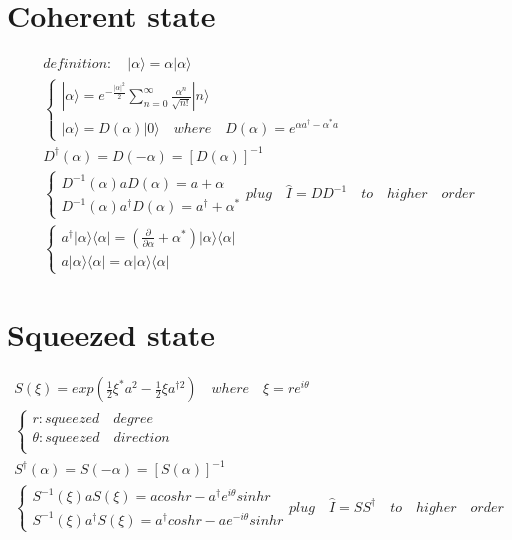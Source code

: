 \documentclass{article}  %
\begin{document}
\section{Coherent state}

\begin{gather}
definition: \quad |\alpha\rangle=\alpha|\alpha\rangle\\
\begin{cases}
|\alpha\rangle=e^{-\frac{|\alpha|^2}{2}}\sum_{n=0}^\infty\frac{\alpha^n}{\sqrt{n!}}|n\rangle\\
|\alpha\rangle=D(\alpha)|0\rangle \quad where \quad D(\alpha)=e^{\alpha a^\dagger-\alpha^*a}
\end{cases}\\
D^\dagger(\alpha)=D(-\alpha)=[D(\alpha)]^{-1}\\
\begin{cases}
D^{-1}(\alpha)aD(\alpha)=a+\alpha\\
D^{-1}(\alpha)a^\dagger D(\alpha)=a^\dagger+\alpha^*
\end{cases}  plug \quad \hat{I}=DD^{-1}\quad to\quad higher \quad order\\
\begin{cases}
a^\dagger|\alpha\rangle\langle\alpha|=(\frac{\partial}{\partial\alpha}+\alpha^*)|\alpha\rangle\langle\alpha|\\
a|\alpha\rangle\langle\alpha|=\alpha|\alpha\rangle\langle\alpha|
\end{cases}
\end{gather}
\section{Squeezed state}

\begin{gather}
S(\xi)=exp(\frac{1}{2}\xi^*a^2-\frac{1}{2}\xi a^{\dagger2}) \quad where \quad \xi=re^{i\theta}\\
\begin{cases}
r:squeezed \quad degree\\
\theta:squeezed \quad direction\\
\end{cases}\\
S^\dagger(\alpha)=S(-\alpha)=[S(\alpha)]^{-1}\\
\begin{cases}
S^{-1}(\xi)aS(\xi)=acoshr-a^\dagger e^{i\theta}sinhr\\
S^{-1}(\xi)a^\dagger S(\xi)=a^\dagger coshr-ae^{-i\theta}sinhr
\end{cases}  plug \quad \hat{I}=SS^\dagger\quad to\quad higher \quad order
\end{gather}







\end{document}

